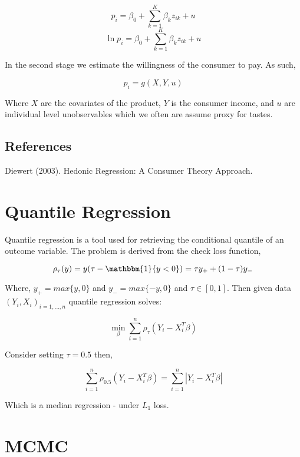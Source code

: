 \documentclass[twoside]{article}
\begin{document}
\begin{equation}\label{eq:lin_assump}
p_i  = \beta_0 + \sum^K_{k=1}\beta_kz_{ik} + u
\end{equation}
\begin{equation}\label{eq:log_assump}
\ln p_i  = \beta_0 + \sum^K_{k=1}\beta_kz_{ik} + u
\end{equation}

In the second stage we estimate the willingness of the consumer to pay. As such,

$$p_i = g(X, Y, u)$$

Where $X$ are the covariates of the product, $Y$ is the consumer income, and $u$ are individual level unobservables which we often are assume proxy for tastes.


\subsection{References}

Diewert (2003). Hedonic Regression: A Consumer Theory Approach.

\section{Quantile Regression}

Quantile regression is a tool used for retrieving the conditional quantile of an outcome variable. The problem is derived from the check loss function, 

\begin{equation}\rho_\tau(y) = y(\tau - \mathbbm{1}\{y<0\})\label{eq:QR_check_loss} = \tau y_+ + (1-\tau)y_-\end{equation}  

Where, $y_+ = max\{y,0\}$ and $y_- = max\{-y,0\}$ and $\tau \in [0,1]$. Then given data $(Y_i, X_i)_{i=1,\dots,n}$ quantile regression solves:

\begin{equation}\min_\beta \sum^n_{i=1}\rho_\tau(Y_i-X_i^T\beta)\end{equation}

Consider setting $\tau = 0.5$ then,

$$\sum^n_{i=1}\rho_{0.5}(Y_i-X_i^T\beta) = \sum^n_{i=1}|Y_i-X_i^T\beta|$$

Which is a median regression - under $L_1$ loss.




\section{MCMC}
\end{document}
